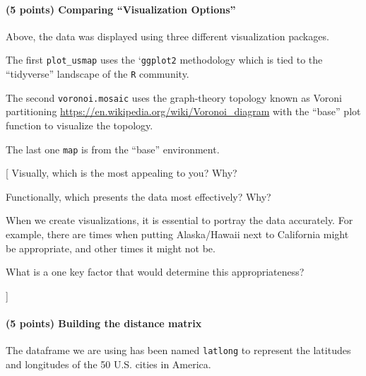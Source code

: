 \documentclass[
]{article}
\begin{document}
\hypertarget{points-comparing-visualization-options}{%
\paragraph{(5 points) Comparing ``Visualization
Options''}\label{points-comparing-visualization-options}}

Above, the data was displayed using three different visualization
packages.

The first \texttt{plot\_usmap} uses the `\texttt{ggplot2} methodology
which is tied to the ``tidyverse'' landscape of the \texttt{R}
community.

The second \texttt{voronoi.mosaic} uses the graph-theory topology known
as Voroni partitioning
\url{https://en.wikipedia.org/wiki/Voronoi_diagram} with the ``base''
plot function to visualize the topology.

The last one \texttt{map} is from the ``base'' environment.

{[} Visually, which is the most appealing to you? Why?

Functionally, which presents the data most effectively? Why?

When we create visualizations, it is essential to portray the data
accurately. For example, there are times when putting Alaska/Hawaii next
to California might be appropriate, and other times it might not be.

What is a one key factor that would determine this appropriateness?

{]}

\hypertarget{points-building-the-distance-matrix}{%
\paragraph{(5 points) Building the distance
matrix}\label{points-building-the-distance-matrix}}

The dataframe we are using has been named \texttt{latlong} to represent
the latitudes and longitudes of the 50 U.S. cities in America.
\end{document}
